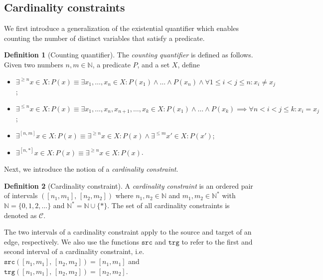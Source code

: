 \documentclass{article}
\theoremstyle{definition}
\newtheorem{definition}{Definition}
\newcommand{\N}{\mathbb{N}}
\newcommand{\src}{\mathtt{src}}
\newcommand{\trg}{\mathtt{trg}}
\begin{document}
\subsection{Cardinality constraints}
\label{sec:cardinality}

We first introduce a generalization of the existential quantifier which enables counting the number of distinct variables that satisfy a predicate.

\begin{definition}[Counting quantifier]
  The \emph{counting quantifier} is defined as follows. Given two numbers $n, m \in \N$, a predicate $P$, and a set $X$, define
  \begin{itemize}
    \item $\exists^{\geq n} x \in X : P(x) \equiv \exists x_1, \ldots, x_n \in X : P(x_1) \wedge \ldots \wedge P(x_n) \wedge \forall 1 \leq i < j \leq n : x_i \neq x_j$;
    \item $\exists^{\leq n} x \in X : P(x) \equiv \exists x_1, \ldots, x_n, x_{n+1}, \ldots, x_k \in X : P(x_1) \wedge \ldots \wedge P(x_k) \implies \forall n < i < j \leq k : x_i = x_j$;
    \item $\exists^{[n, m]} x \in X : P(x) \equiv \exists^{\geq n} x \in X : P(x) \wedge \exists^{\leq m} x' \in X : P(x')$;
    \item $\exists^{[n, *]} x \in X : P(x) \equiv \exists^{\geq n} x \in X : P(x)$.
  \end{itemize}
\end{definition}

Next, we introduce the notion of a \emph{cardinality constraint}.

\begin{definition}[Cardinality constraint]
  \label{def:cardinality-constraint}
  A \emph{cardinality constraint} is an ordered pair of intervals $([n_1, m_1], \, [n_2, m_2])$ where $n_1, n_2 \in \N$ and $m_1, m_2 \in \N^*$ with $\N = \{0, 1, 2, \ldots\}$ and $\N^* = \N \cup \{*\}$. The set of all cardinality constraints is denoted as $\mathcal{C}$.
\end{definition}

The two intervals of a cardinality constraint apply to the source and target of an edge, respectively. We also use the functions $\src$ and $\trg$ to refer to the first and second interval of a cardinality constraint, i.e. $\src([n_1, m_1], \, [n_2, m_2]) = [n_1, m_1]$ and $\trg([n_1, m_1], \, [n_2, m_2]) = [n_2, m_2]$.
\end{document}
